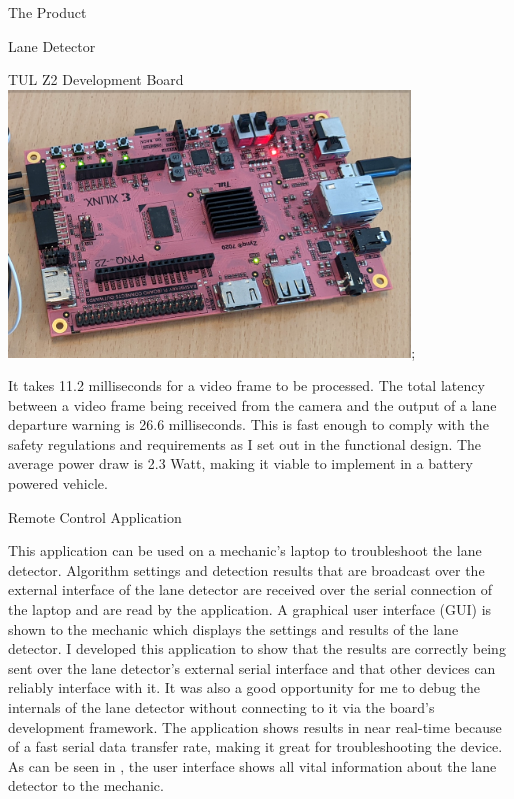 \documentclass{matthijs}
\begin{document}
\begin{hoofdstuk}{The Product}
\begin{paragraaf}{Lane Detector}
			\begin{figuur}{TUL Z2 Development Board}
				\includegraphics[width=0.8\textwidth]{product-6.png};
			\end{figuur}

			\noindent It takes 11.2 milliseconds for a video frame to be processed.
			The total latency between a video frame being received from the camera and the output of a lane departure warning is 26.6 milliseconds.
			This is fast enough to comply with the safety regulations and requirements as I set out in the functional design.
			The average power draw is 2.3 Watt, making it viable to implement in a battery powered vehicle.

		\end{paragraaf}

		\begin{paragraaf}{Remote Control Application}

			This application can be used on a mechanic's laptop to troubleshoot the lane detector.
			Algorithm settings and detection results that are broadcast over the external interface of the lane detector are received over the serial connection of the laptop and are read by the application.
			A graphical user interface (GUI) is shown to the mechanic which displays the settings and results of the lane detector.
			I developed this application to show that the results are correctly being sent over the lane detector's external serial interface and that other devices can reliably interface with it.
			It was also a good opportunity for me to debug the internals of the lane detector without connecting to it via the board's development framework.
			The application shows results in near real-time because of a fast serial data transfer rate, making it great for troubleshooting the device.
			As can be seen in , the user interface shows all vital information about the lane detector to the mechanic.


\end{paragraaf}
\end{hoofdstuk}
\end{document}
